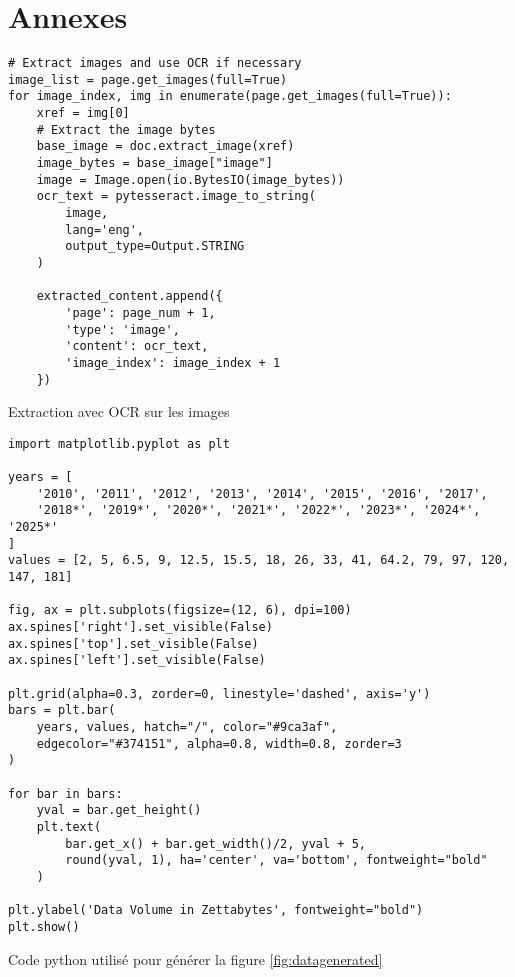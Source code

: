 \thispagestyle{empty}


\vspace*{3cm}

\chapter*{Annexes}
\label{appendix} 

\begin{listing}[!ht]
\begin{verbatim}
# Extract images and use OCR if necessary
image_list = page.get_images(full=True)
for image_index, img in enumerate(page.get_images(full=True)):
    xref = img[0]
    # Extract the image bytes
    base_image = doc.extract_image(xref)
    image_bytes = base_image["image"]
    image = Image.open(io.BytesIO(image_bytes))
    ocr_text = pytesseract.image_to_string(
        image, 
        lang='eng',
        output_type=Output.STRING
    )
    
    extracted_content.append({
        'page': page_num + 1, 
        'type': 'image', 
        'content': ocr_text, 
        'image_index': image_index + 1
    })
\end{verbatim}
\caption{Extraction avec OCR sur les images}
\label{appendix:code:python:text-extract-images}
\end{listing}

\begin{listing}[!ht]
\begin{verbatim}
import matplotlib.pyplot as plt

years = [
    '2010', '2011', '2012', '2013', '2014', '2015', '2016', '2017', 
    '2018*', '2019*', '2020*', '2021*', '2022*', '2023*', '2024*', '2025*'
]
values = [2, 5, 6.5, 9, 12.5, 15.5, 18, 26, 33, 41, 64.2, 79, 97, 120, 147, 181]

fig, ax = plt.subplots(figsize=(12, 6), dpi=100)
ax.spines['right'].set_visible(False)
ax.spines['top'].set_visible(False)
ax.spines['left'].set_visible(False)

plt.grid(alpha=0.3, zorder=0, linestyle='dashed', axis='y')
bars = plt.bar(
    years, values, hatch="/", color="#9ca3af", 
    edgecolor="#374151", alpha=0.8, width=0.8, zorder=3
)

for bar in bars:
    yval = bar.get_height()
    plt.text(
        bar.get_x() + bar.get_width()/2, yval + 5, 
        round(yval, 1), ha='center', va='bottom', fontweight="bold"
    )

plt.ylabel('Data Volume in Zettabytes', fontweight="bold")
plt.show()
\end{verbatim}
\caption{Code python utilisé pour générer la figure \ref{fig:datagenerated}}
\label{appendix:code:python:plot-generation}
\end{listing}

